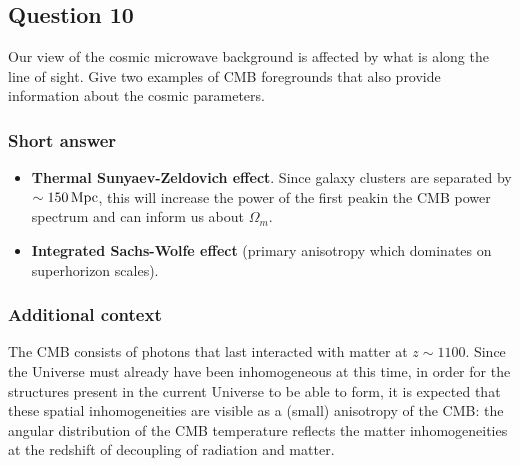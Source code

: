 \documentclass[a4paper,11pt]{article}
\begin{document}
%
%

\newpage
\subsection{Question 10}

Our view of the cosmic microwave background is affected by what is along the line of sight. Give two examples of CMB foregrounds that also provide information about the cosmic parameters.

\subsubsection{Short answer}

\begin{itemize}
    \item \textbf{Thermal Sunyaev-Zeldovich effect}. Since galaxy clusters are separated by $\sim150\,{\rm Mpc}$, this will increase the power of the first peakin the CMB power spectrum and can inform us about $\Omega_m$.
    \item \textbf{Integrated Sachs-Wolfe effect} (primary anisotropy which dominates on superhorizon scales).
\end{itemize}

\subsubsection{Additional context}

{\noindent}The CMB consists of photons that last interacted with matter at $z\sim1100$. Since the Universe must already have been inhomogeneous at this time, in order for the structures present in the current Universe to be able to form, it is expected that these spatial inhomogeneities are visible as a (small) anisotropy of the CMB: the angular distribution of the CMB temperature reflects the matter inhomogeneities at the redshift of decoupling of radiation and matter.
\end{document}
